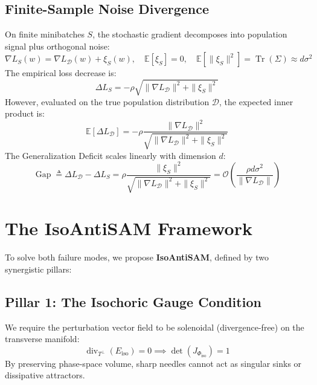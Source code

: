 \documentclass[11pt,a4paper]{article}
\begin{document}
\subsection{Finite-Sample Noise Divergence}
On finite minibatches $S$, the stochastic gradient decomposes into population signal plus orthogonal noise:
\begin{equation}
\nabla L_S(w) = \nabla L_{\mathcal{D}}(w) + \xi_S(w), \quad \mathbb{E}[\xi_S] = 0, \quad \mathbb{E}[\|\xi_S\|^2] = \operatorname{Tr}(\Sigma) \approx d \sigma^2
\end{equation}
The empirical loss decrease is:
\begin{equation}
\Delta L_S = -\rho \sqrt{\|\nabla L_{\mathcal{D}}\|^2 + \|\xi_S\|^2}
\end{equation}
However, evaluated on the true population distribution $\mathcal{D}$, the expected inner product is:
\begin{equation}
\mathbb{E}[\Delta L_{\mathcal{D}}] = -\rho \frac{\|\nabla L_{\mathcal{D}}\|^2}{\sqrt{\|\nabla L_{\mathcal{D}}\|^2 + \|\xi_S\|^2}}
\end{equation}
The Generalization Deficit scales linearly with dimension $d$:
\begin{equation}
\operatorname{Gap} \triangleq \Delta L_{\mathcal{D}} - \Delta L_S = \rho \frac{\|\xi_S\|^2}{\sqrt{\|\nabla L_{\mathcal{D}}\|^2 + \|\xi_S\|^2}} = \mathcal{O}\left(\frac{\rho d \sigma^2}{\|\nabla L_{\mathcal{D}}\|}\right)
\end{equation}

\section{The IsoAntiSAM Framework}

To solve both failure modes, we propose \textbf{IsoAntiSAM}, defined by two synergistic pillars:

\subsection{Pillar 1: The Isochoric Gauge Condition}
We require the perturbation vector field to be solenoidal (divergence-free) on the transverse manifold:
\begin{equation}
\operatorname{div}_{T^\perp}(E_{\text{iso}}) = 0 \implies \det(J_{\Phi_{\text{iso}}}) = 1
\end{equation}
By preserving phase-space volume, sharp needles cannot act as singular sinks or dissipative attractors.
\end{document}
